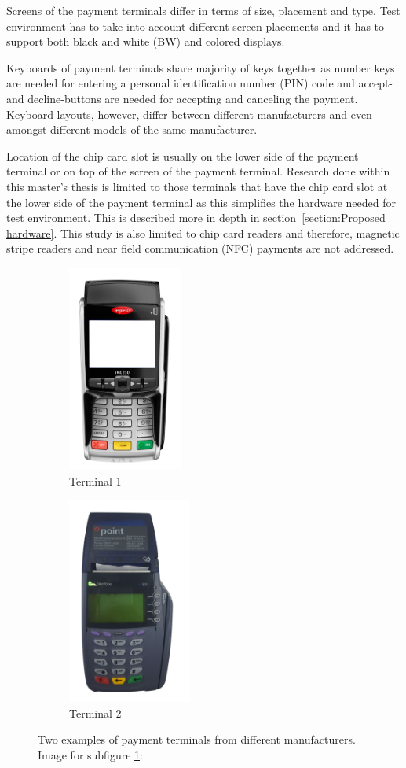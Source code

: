 Screens of the payment terminals differ in terms of size, placement and type. Test environment has to take into account different screen placements and it has to support both black and white (BW) and colored displays.

Keyboards of payment terminals share majority of keys together as number keys are needed for entering a personal identification number (PIN) code and accept- and decline-buttons are needed for accepting and canceling the payment. Keyboard layouts, however, differ between different manufacturers and even amongst different models of the same manufacturer.

Location of the chip card slot is usually on the lower side of the payment terminal or on top of the screen of the payment terminal. Research done within this master's thesis is limited to those terminals that have the chip card slot at the lower side of the payment terminal as this simplifies the hardware needed for test environment. This is described more in depth in section~\ref{section:Proposed hardware}. This study is also limited to chip card readers and therefore, magnetic stripe readers and near field communication (NFC) payments are not addressed.

\begin{figure}
\centering
\begin{subfigure}{0.5\textwidth}
  \centering
  \includegraphics[height=6.8cm]{images/terminal1_1.png}
  \caption{Terminal 1}
  \label{fig:sub1}
\end{subfigure}%
\begin{subfigure}{0.5\textwidth}
  \centering
  \includegraphics[height=6.8cm]{images/terminal1_2.png}
  \caption{Terminal 2}
  \label{fig:sub2}
\end{subfigure}
\caption{Two examples of payment terminals from different manufacturers. Image for subfigure \ref{fig:sub1}: \citep{image1}}
\label{fig:terminals}
\end{figure}

